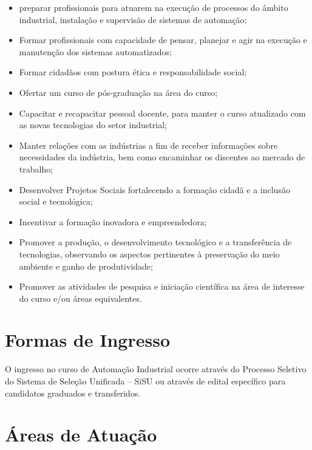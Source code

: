 \begin{itemize}

\item preparar profissionais para atuarem na execução de processos do âmbito industrial, instalação e supervisão de sistemas de automação;

\item Formar profissionais com capacidade de pensar, planejar e agir na execução e manutenção dos sistemas automatizados;

\item Formar cidadãos com postura ética e responsabilidade social;

\item Ofertar um curso de pós-graduação na área do curso;

\item Capacitar e recapacitar pessoal docente, para manter o curso atualizado com as novas tecnologias do setor industrial;

\item Manter relações com as indústrias a fim de receber informações sobre necessidades da indústria, bem como encaminhar os discentes ao mercado de trabalho;

\item  Desenvolver Projetos Sociais fortalecendo a formação cidadã e a inclusão social e tecnológica;

\item Incentivar a formação inovadora e empreendedora;

\item Promover a produção, o desenvolvimento tecnológico e a transferência de tecnologias, observando os aspectos pertinentes à preservação do meio ambiente e ganho de produtividade;

\item Promover as atividades de pesquisa e iniciação científica na área de interesse do curso e/ou áreas equivalentes.

\end{itemize}

\chapter{Formas de Ingresso}

O ingresso no curso de Automação Industrial ocorre através do Processo Seletivo do Sistema de Seleção Unificada – SiSU ou através de edital específico para candidatos graduados e transferidos.

\chapter{Áreas de Atuação}

